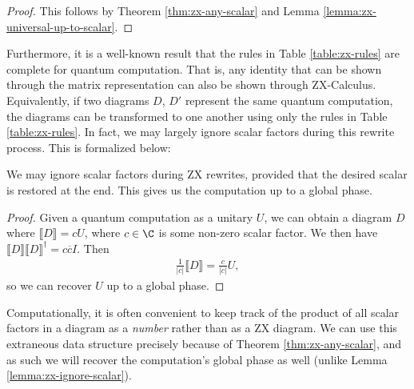\begin{proof}
This follows by Theorem \ref{thm:zx-any-scalar} and Lemma \ref{lemma:zx-universal-up-to-scalar}.
\end{proof}

Furthermore, it is a well-known result \cite{ZX-Complete} that the rules in Table \ref{table:zx-rules} are complete for quantum computation. That is, any identity that can be shown through the matrix representation can also be shown through ZX-Calculus. Equivalently, if two diagrams $D$, $D'$ represent the same quantum computation, the diagrams can be transformed to one another using only the rules in Table \ref{table:zx-rules}. In fact, we may largely ignore scalar factors during this rewrite process. This is formalized below:

\begin{lemma}
\label{lemma:zx-ignore-scalar}
We may ignore scalar factors during ZX rewrites, provided that the desired scalar is restored at the end. This gives us the computation up to a global phase.
\end{lemma}

\begin{proof}
Given a quantum computation as a unitary $U$, we can obtain a diagram $D$ where $\llbracket D \rrbracket = c U$, where $c \in \C$ is some non-zero scalar factor. We then have $\llbracket D \rrbracket \llbracket D \rrbracket^\dagger = c \overline{c} I$. Then 
\begin{align}
    \frac{1}{|c|} \llbracket D \rrbracket 
    = \frac{c}{|c|} U,
\end{align} 
so we can recover $U$ up to a global phase.
\end{proof}

Computationally, it is often convenient to keep track of the product of all scalar factors in a diagram as a \emph{number} rather than as a ZX diagram. We can use this extraneous data structure precisely because of Theorem \ref{thm:zx-any-scalar}, and as such we will recover the computation's global phase as well (unlike Lemma \ref{lemma:zx-ignore-scalar}).